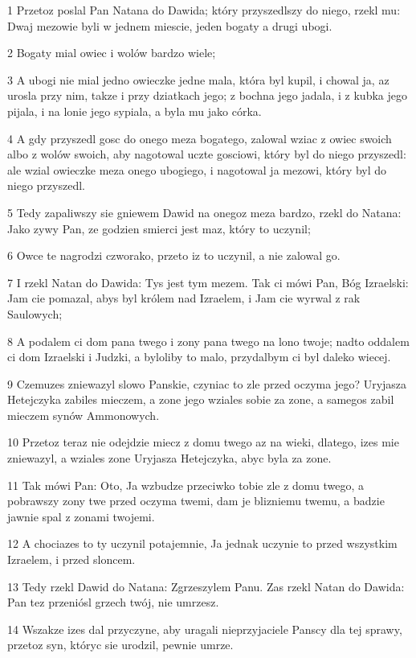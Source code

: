 \par 1 Przetoz poslal Pan Natana do Dawida; który przyszedlszy do niego, rzekl mu: Dwaj mezowie byli w jednem miescie, jeden bogaty a drugi ubogi.
\par 2 Bogaty mial owiec i wolów bardzo wiele;
\par 3 A ubogi nie mial jedno owieczke jedne mala, która byl kupil, i chowal ja, az urosla przy nim, takze i przy dziatkach jego; z bochna jego jadala, i z kubka jego pijala, i na lonie jego sypiala, a byla mu jako córka.
\par 4 A gdy przyszedl gosc do onego meza bogatego, zalowal wziac z owiec swoich albo z wolów swoich, aby nagotowal uczte gosciowi, który byl do niego przyszedl: ale wzial owieczke meza onego ubogiego, i nagotowal ja mezowi, który byl do niego przyszedl.
\par 5 Tedy zapaliwszy sie gniewem Dawid na onegoz meza bardzo, rzekl do Natana: Jako zywy Pan, ze godzien smierci jest maz, który to uczynil;
\par 6 Owce te nagrodzi czworako, przeto iz to uczynil, a nie zalowal go.
\par 7 I rzekl Natan do Dawida: Tys jest tym mezem. Tak ci mówi Pan, Bóg Izraelski: Jam cie pomazal, abys byl królem nad Izraelem, i Jam cie wyrwal z rak Saulowych;
\par 8 A podalem ci dom pana twego i zony pana twego na lono twoje; nadto oddalem ci dom Izraelski i Judzki, a byloliby to malo, przydalbym ci byl daleko wiecej.
\par 9 Czemuzes zniewazyl slowo Panskie, czyniac to zle przed oczyma jego? Uryjasza Hetejczyka zabiles mieczem, a zone jego wziales sobie za zone, a samegos zabil mieczem synów Ammonowych.
\par 10 Przetoz teraz nie odejdzie miecz z domu twego az na wieki, dlatego, izes mie zniewazyl, a wziales zone Uryjasza Hetejczyka, abyc byla za zone.
\par 11 Tak mówi Pan: Oto, Ja wzbudze przeciwko tobie zle z domu twego, a pobrawszy zony twe przed oczyma twemi, dam je blizniemu twemu, a badzie jawnie spal z zonami twojemi.
\par 12 A chociazes to ty uczynil potajemnie, Ja jednak uczynie to przed wszystkim Izraelem, i przed sloncem.
\par 13 Tedy rzekl Dawid do Natana: Zgrzeszylem Panu. Zas rzekl Natan do Dawida: Pan tez przeniósl grzech twój, nie umrzesz.
\par 14 Wszakze izes dal przyczyne, aby uragali nieprzyjaciele Panscy dla tej sprawy, przetoz syn, któryc sie urodzil, pewnie umrze.

